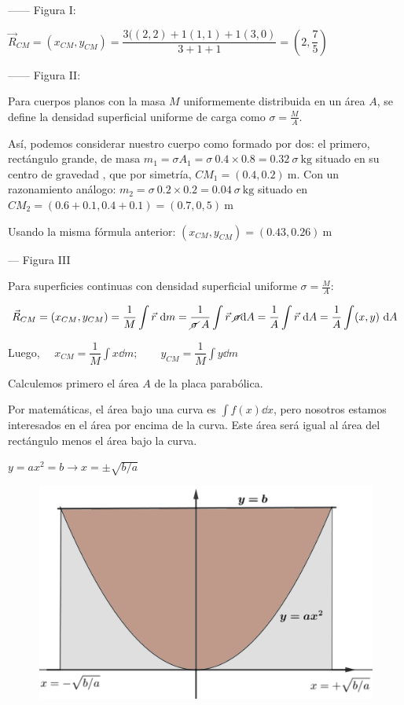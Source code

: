 ------ Figura I:

$\vec R_{CM}=(x_{CM},y_{CM})=\dfrac {3((2,2)+1(1,1)+1(3,0)}{3+1+1}=\left( 2, \dfrac 7 5 \right)$

------ Figura II:

Para cuerpos planos  con la masa $M$ uniformemente distribuida en un área $A$, se define la densidad superficial uniforme de carga como $\sigma =\frac M A$. 

Así, podemos considerar nuestro cuerpo como formado por dos: el primero, rectángulo grande, de masa  $m_1= \sigma A_1=\sigma  \ 0.4 \times 0.8=0.32 \ \sigma\  \text{kg}$ situado en su centro de gravedad , que por simetría, $CM_{1}=(0.4,0.2)\ \text{m}$. Con un razonamiento análogo: $m_2=\sigma \ 0.2 \times 0.2=0.04 \ \sigma \ \text{kg}$ situado en $CM_2=(0.6+0.1, 0.4+0.1)=(0.7,0,5)\ \text{m}$

Usando la misma fórmula anterior: $(x_{CM},y_{CM})=(0.43,0.26)\ \text{m}$

--- Figura III

Para superficies continuas con densidad superficial uniforme $\sigma=\frac M A$:

$\displaystyle \vec R_{CM}=(x_{CM},y_{CM})=\dfrac 1 M \int \vec r \ \dd m
= \dfrac 1 {\cancel{\sigma} \ A} \int \vec r \ \cancel{\sigma} \dd A= \dfrac  1 A \int \vec r \ \dd A=
\dfrac 1 A \int (x,y) \ \dd A $

Luego, $\displaystyle \quad x_{CM}=\dfrac 1 M \int x \dd m;\qquad y_{CM}=\dfrac 1 M \int y \dd m$

Calculemos primero el área $A$ de la placa parabólica. 

\begin{multicols}{2}
Por matemáticas, el área bajo una curva es $\int f(x)\dd x$, pero nosotros estamos interesados en el área por encima de la curva. Este área será igual al área del rectángulo menos el área bajo la curva.

$y=ax^2=b \to x=\pm \sqrt{b/a}$
\begin{figure}[H]
	\centering
	\includegraphics[width=.4\textwidth]{imagenes/imagenes12/T12IM07.png}
\end{figure}
\end{multicols}

